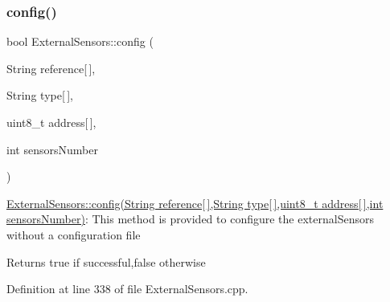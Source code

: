 \subsubsection{\texorpdfstring{config()}{config()}\hspace{0.1cm}{\footnotesize\ttfamily [2/2]}}
{\footnotesize\ttfamily bool External\+Sensors\+::config (\begin{DoxyParamCaption}\item[{String}]{reference\mbox{[}$\,$\mbox{]},  }\item[{String}]{type\mbox{[}$\,$\mbox{]},  }\item[{uint8\+\_\+t}]{address\mbox{[}$\,$\mbox{]},  }\item[{int}]{sensors\+Number }\end{DoxyParamCaption})}

\hyperlink{class_external_sensors_ac829858f587e15a3fcb00567248f0edd}{External\+Sensors\+::config(\+String reference\mbox{[}$\,$\mbox{]},\+String type\mbox{[}$\,$\mbox{]},uint8\+\_\+t address\mbox{[}$\,$\mbox{]},int sensors\+Number)}\+: This method is provided to configure the external\+Sensors without a configuration file

\begin{DoxyReturn}{Returns}
true if successful,false otherwise 
\end{DoxyReturn}


Definition at line 338 of file External\+Sensors.\+cpp.


